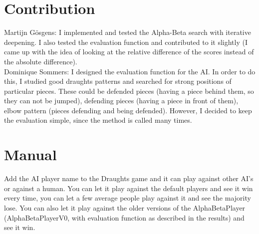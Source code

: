 \documentclass[a4paper,twoside,11pt]{article}
\begin{document}
\section{Contribution}
Martijn Gösgens: I implemented and tested the Alpha-Beta search with iterative deepening. I also tested the evaluation function and contributed to it slightly (I came up with the idea of looking at the relative difference of the scores instead of the absolute difference). \\
Dominique Sommers: I designed the evaluation function for the AI. In order to do this, I studied good draughts patterns and searched for strong positions of particular pieces. These could be defended pieces (having a piece behind them, so they can not be jumped), defending pieces (having a piece in front of them), elbow pattern (pieces defending and being defended). However, I decided to keep the evaluation simple, since the method is called many times.

\section{Manual}
Add the AI player name to the Draughts game and it can play against other AI's or against a human. You can let it play against the default players and see it win every time, you can let a few average people play against it and see the majority lose. You can also let it play against the older versions of the AlphaBetaPlayer (AlphaBetaPlayerV0, with evaluation function as described in the results) and see it win.
\end{document}
